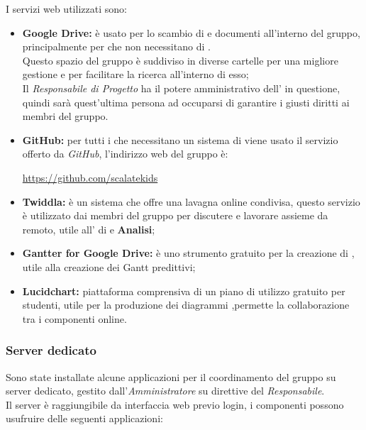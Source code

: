 \documentclass{scalatekids-article}
\begin{document}
\label{sec:ServiziWeb}
I servizi web utilizzati sono:
\begin{itemize}
    \item\textbf{Google Drive:} è usato per lo scambio di  e documenti all'interno del gruppo, principalmente per  che non necessitano di .\\
        Questo spazio del gruppo è suddiviso in diverse cartelle per una migliore gestione e per facilitare la ricerca all'interno di esso;\\
        Il \textit{Responsabile di Progetto} ha il potere amministrativo dell' in questione, quindi sarà quest'ultima persona ad occuparsi di garantire i giusti diritti ai membri del gruppo.
    \item\textbf{GitHub:} per tutti i  che necessitano un sistema di  viene usato il servizio offerto da \textit{GitHub}, l'indirizzo web del gruppo è:\\
        \begin{center}
            \url{https://github.com/scalatekids}
        \end{center}
    \item\textbf{Twiddla:} è un sistema che offre una lavagna online condivisa, questo servizio è utilizzato dai membri del gruppo per discutere e lavorare assieme da remoto, utile all' di  e \textbf{Analisi};
    \item\textbf{Gantter for Google Drive:} è uno strumento gratuito per la creazione di , utile alla creazione dei Gantt predittivi;
    \item\textbf{Lucidchart:} piattaforma comprensiva di un piano di utilizzo
        gratuito per studenti, utile per la produzione dei diagrammi
        ,permette la collaborazione tra i componenti online.
\end{itemize}

\subsubsection{Server dedicato}

\label{sec:server}
Sono state installate alcune applicazioni per il coordinamento del gruppo su
server dedicato, gestito dall'\textit{Amministratore} su direttive del
\textit{Responsabile}.\\ Il server è raggiungibile da interfaccia web previo
login, i componenti possono usufruire delle seguenti applicazioni:
\end{document}
